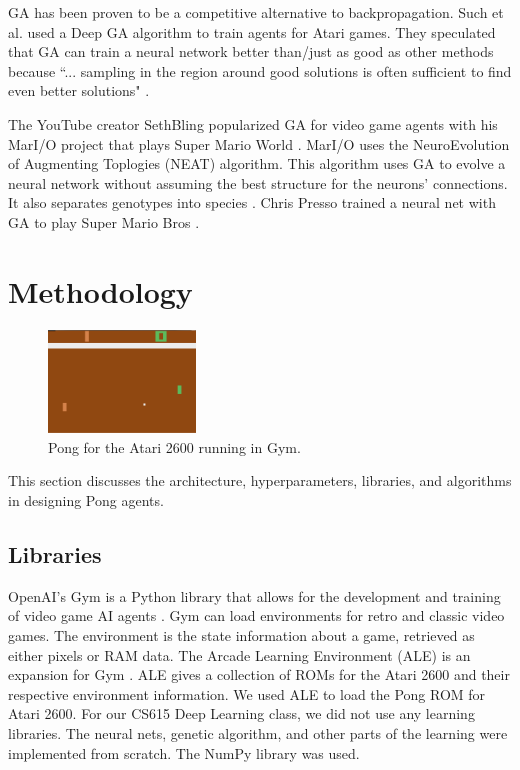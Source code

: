 \documentclass[conference]{IEEEtran}
\begin{document}
GA has been proven to be a competitive alternative to backpropagation. Such et al. used a Deep GA algorithm to train agents for Atari games. They speculated that GA can train a neural network better than/just as good as other methods because ``... sampling in the region around good solutions is often sufficient to find even better solutions" \cite{DBLP:journals/corr/abs-1712-06567}. 

The YouTube creator SethBling popularized GA for video game agents with his MarI/O project that plays Super Mario World \cite{mario}. MarI/O uses the NeuroEvolution of Augmenting Toplogies (NEAT) algorithm. This algorithm uses GA to evolve a neural network without assuming the best structure for the neurons' connections. It also separates genotypes into species \cite{stanley2002evolving}. Chris Presso trained a neural net with GA to play Super Mario Bros \cite{presso}. 

\section{Methodology}

\begin{figure}[htbp]
\centerline{\includegraphics[width=0.35\textwidth]{pong2600.png}}
\caption{Pong for the Atari 2600 running in Gym.}
\label{pong2600}
\end{figure}

This section discusses the architecture, hyperparameters, libraries, and algorithms in designing Pong agents. 

\subsection{Libraries}

OpenAI's Gym is a Python library that allows for the development and training of video game AI agents \cite{DBLP:journals/corr/BrockmanCPSSTZ16}. Gym can load environments for retro and classic video games. The environment is the state information about a game, retrieved as either pixels or RAM data. The Arcade Learning Environment (ALE) is an expansion for Gym \cite{DBLP:journals/corr/abs-1709-06009}. ALE gives a collection of ROMs for the Atari 2600 and their respective environment information. We used ALE to load the Pong ROM for Atari 2600. For our CS615 Deep Learning class, we did not use any learning libraries. The neural nets, genetic algorithm, and other parts of the learning were implemented from scratch. The NumPy library was used.
\end{document}
